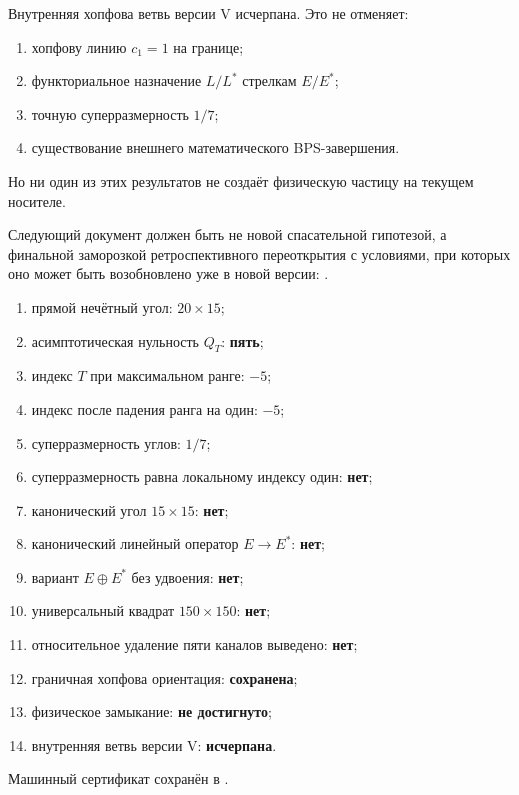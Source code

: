 Внутренняя хопфова ветвь версии V исчерпана. Это не отменяет:
\begin{enumerate}
 \item хопфову линию $c_1=1$ на границе;
 \item функториальное назначение $L/L^*$ стрелкам $E/E^*$;
 \item точную суперразмерность $1/7$;
 \item существование внешнего математического BPS-завершения.
\end{enumerate}
Но ни один из этих результатов не создаёт физическую частицу на текущем
носителе.

Следующий документ должен быть не новой спасательной гипотезой, а
финальной заморозкой ретроспективного переоткрытия с условиями, при которых
оно может быть возобновлено уже в новой версии:
.

\begin{protocol}
\begin{enumerate}
 \item прямой нечётный угол: \textbf{$20\times15$};
 \item асимптотическая нульность $Q_T$: \textbf{пять};
 \item индекс $T$ при максимальном ранге: \textbf{$-5$};
 \item индекс после падения ранга на один: \textbf{$-5$};
 \item суперразмерность углов: \textbf{$1/7$};
 \item суперразмерность равна локальному индексу один: \textbf{нет};
 \item канонический угол $15\times15$: \textbf{нет};
 \item канонический линейный оператор $E\to E^*$: \textbf{нет};
 \item вариант $E\oplus E^*$ без удвоения: \textbf{нет};
 \item универсальный квадрат $150\times150$: \textbf{нет};
 \item относительное удаление пяти каналов выведено: \textbf{нет};
 \item граничная хопфова ориентация: \textbf{сохранена};
 \item физическое замыкание: \textbf{не достигнуто};
 \item внутренняя ветвь версии V: \textbf{исчерпана}.
\end{enumerate}
\end{protocol}

Машинный сертификат сохранён в
.
